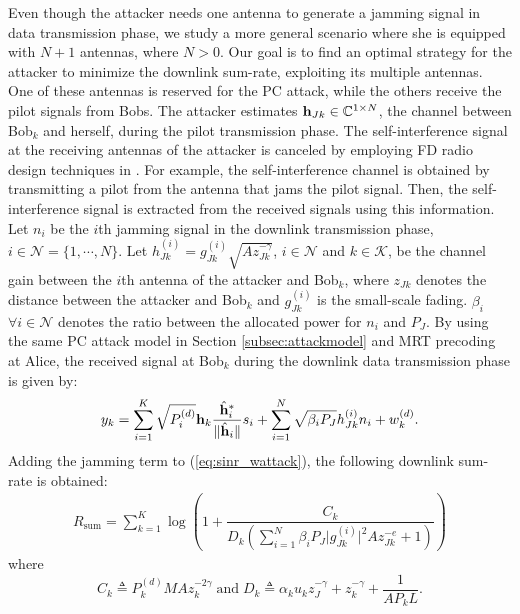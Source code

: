 \documentclass[draftclsnofoot, 12pt, onecolumn, journal]{IEEEtran}
\newcommand{\hv}{{\bf h}}
\begin{document}
Even though the attacker needs one antenna to generate a jamming signal in data transmission phase, we study a more general scenario where she is equipped with $N+1$ antennas, where $N > 0 $.
Our goal is to find an optimal strategy for the attacker to minimize the downlink sum-rate, exploiting its multiple antennas.
One of these antennas is reserved for the PC attack, while the others receive the pilot signals from Bobs.
The attacker estimates $\hv_{Jk} \in \mathbb{C}^{1 \times N}$, the channel between Bob$_k$ and herself, during the pilot transmission phase.
The self-interference signal at the receiving antennas of the attacker is canceled by employing FD radio design techniques in \cite{bharadia2013full, bharadia2014full}. 
For example, the self-interference channel is obtained by transmitting a pilot from the antenna that jams the pilot signal.
Then, the self-interference signal is extracted from the received signals using this information.
Let $n_i$ be the $i$th jamming signal in the downlink transmission phase, $ i \in \mathcal{N} = \{1, \cdots, N\}$.
Let $h_{Jk}^{(i)} = g_{Jk}^{(i)} \sqrt{A z_{Jk}^{-\gamma}} $, $i \in \mathcal{N}$ and $k \in \mathcal{K}$, be the channel gain between the $i$th antenna of the attacker and Bob$_k$, where $ z_{Jk}$ denotes the distance between the attacker and Bob$_k$ and $g_{Jk}^{(i)}$ is the small-scale fading. 
$\beta_i$ $\forall i \in \mathcal{N}$ denotes the ratio between the allocated power for $n_i$ and $P_J$.
By using the same PC attack model in Section \ref{subsec:attackmodel} and MRT precoding at Alice, the received signal at Bob$_{k}$ during the downlink data transmission phase is given by:
%
\begin{align}
y_k = \sum_{i = 1}^K \sqrt{P_i^{(d)}} \hv_k \dfrac{\hat{\hv}_i^*}{ \Vert \hat{\hv}_i \Vert } s_i +
\sum_{i = 1}^N \sqrt{\beta_i P_J} h_{Jk}^{(i)} n_{i} + w_k^{(d)}.
\end{align}
%
Adding the jamming term to (\ref{eq:sinr_wattack}), the following downlink sum-rate is obtained: 
%
\begin{align}
\label{eq:rsum_adv}
R_{\mathrm{sum}} = \sum_{k=1}^K \log \left( 1 + \dfrac{ C_k }{ D_k  \left( \sum_{i = 1}^N \beta_i P_J \vert g_{Jk}^{(i)} \vert^2 A z_{Jk}^{-e}  + 1 \right)}  \right)
\end{align}
%
where $$ C_k \triangleq P_k^{(d)} M A z_k^{-2\gamma} \; \mathrm{and} \; D_k \triangleq \alpha_k u_k z_J^{-\gamma} + z_k^{-\gamma} + \frac{1}{A P_k L} .$$
\end{document}
